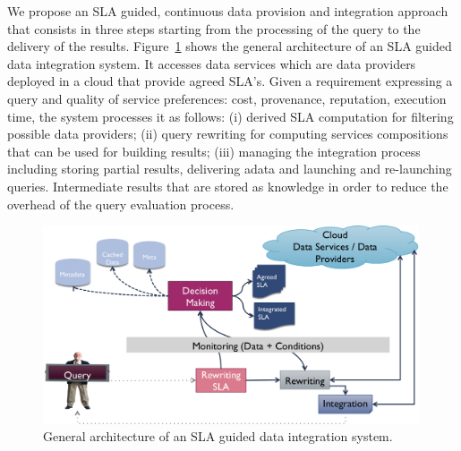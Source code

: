 We propose an SLA guided, continuous data provision and integration approach that consists in three steps  starting from the processing of the query  to the delivery of the results.
Figure~\ref{fig:arch} shows the general architecture of an SLA guided data integration system. It accesses data services which are data providers deployed in a cloud  that provide agreed SLA’s. 
Given a requirement expressing a query and quality of service preferences: cost, provenance, reputation, execution time, the system processes it  as follows: (i) derived SLA  computation for filtering possible data providers; (ii) query rewriting for computing services compositions that can be used for building results; (iii) managing the integration process including storing partial results, delivering adata and launching and re-launching queries. Intermediate results that are stored as knowledge in order to reduce the overhead of the query evaluation process. 


\begin{figure}
\includegraphics[width=0.99\textwidth]{figs/arch.png}
\caption{General architecture of an SLA guided  data integration system.\label{fig:arch}}
\end{figure}

